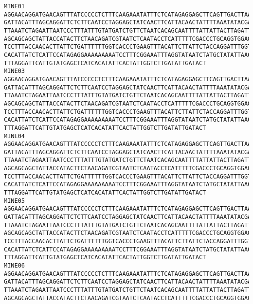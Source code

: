 \documentclass[11pt]{article}
\begin{document}
    \begin{Verbatim}[commandchars=\\\{\}]
MINE01
AGGAACAGGATGAACAGTTTATCCCCCTCTTTCAAGAAATATTTCTCATAGAGGAGCTTCAGTTGACTTAAGAATCTTCA
GATTACATTTAGCAGGATTCTCTTCAATCCTAGGAGCTATCAACTTCATTACAACTATTTTAAATATACGACCAAAAAAC
TTAAATCTAGAATTAATCCCTTTATTTGTATGATCTGTTCTAATCACAGCAATTTTATTATTACTTAGATTACCAGTCTT
AGCAGCAGCTATTACCATACTTCTAACAGATCGTAATCTCAATACCTCATTTTTCGACCCTGCAGGTGGAGGAGACCCAA
TCCTTTACCAACACTTATTCTGATTTTTTGGTCACCCTGAAGTTTACATTCTTATTCTACCAGGATTTGGTATTATTTCT
CACATTATCTCATTCCATAGAGGAAAAAAAAATCCTTTCGGAAATTTAGGTATAATCTATGCTATATTAACTATTGGAAT
TTTAGGATTCATTGTATGAGCTCATCACATATTCACTATTGGTCTTGATATTGATACT
MINE03
AGGAACAGGATGAACAGTTTATCCCCCTCTTTCAAGAAATATTTCTCATAGAGGAGCTTCAGTTGACTTAAGAATCTTCA
GATTACATTTAGCAGGATTCTCTTCAATCCTAGGAGCTATCAACTTCATTACAACTATTTTAAATATACGACCAAAAAAC
TTAAATCTAGAATTAATCCCTTTATTTGTATGATCTGTTCTAATCACAGCAATTTTATTATTACTTAGATTACCAGTCTT
AGCAGCAGCTATTACCATACTTCTAACAGATCGTAATCTCAATACCTCATTTTTCGACCCTGCAGGTGGAGGAGACCCAA
TCCTTTACCAACACTTATTCTGATTTTTTGGTCACCCTGAAGTTTACATTCTTATTCTACCAGGATTTGGTATTATTTCT
CACATTATCTCATTCCATAGAGGAAAAAAAAATCCTTTCGGAAATTTAGGTATAATCTATGCTATATTAACTATTGGAAT
TTTAGGATTCATTGTATGAGCTCATCACATATTCACTATTGGTCTTGATATTGATACT
MINE04
AGGAACAGGATGAACAGTTTATCCCCCTCTTTCAAGAAATATTTCTCATAGAGGAGCTTCAGTTGACTTAAGAATCTTCA
GATTACATTTAGCAGGATTCTCTTCAATCCTAGGAGCTATCAACTTCATTACAACTATTTTAAATATACGACCAAAAAAC
TTAAATCTAGAATTAATCCCTTTATTTGTATGATCTGTTCTAATCACAGCAATTTTATTATTACTTAGATTACCAGTCTT
AGCAGCAGCTATTACCATACTTCTAACAGATCGTAATCTCAATACCTCATTTTTCGACCCTGCAGGTGGAGGAGACCCAA
TCCTTTACCAACACTTATTCTGATTTTTTGGTCACCCTGAAGTTTACATTCTTATTCTACCAGGATTTGGTATTATTTCT
CACATTATCTCATTCCATAGAGGAAAAAAAAATCCTTTCGGAAATTTAGGTATAATCTATGCTATATTAACTATTGGAAT
TTTAGGATTCATTGTATGAGCTCATCACATATTCACTATTGGTCTTGATATTGATACT
MINE05
AGGAACAGGATGAACAGTTTATCCCCCTCTTTCAAGAAATATTTCTCATAGAGGAGCTTCAGTTGACTTAAGAATCTTCA
GATTACATTTAGCAGGATTCTCTTCAATCCTAGGAGCTATCAACTTCATTACAACTATTTTAAATATACGACCAAAAAAC
TTAAATCTAGAATTAATCCCTTTATTTGTATGATCTGTTCTAATCACAGCAATTTTATTATTACTTAGATTACCAGTCTT
AGCAGCAGCTATTACCATACTTCTAACAGATCGTAATCTCAATACCTCATTTTTCGACCCTGCAGGTGGAGGAGACCCAA
TCCTTTACCAACACTTATTCTGATTTTTTGGTCACCCTGAAGTTTACATTCTTATTCTACCAGGATTTGGTATTATTTCT
CACATTATCTCATTCCATAGAGGAAAAAAAAATCCTTTCGGAAATTTAGGTATAATCTATGCTATATTAACTATTGGAAT
TTTAGGATTCATTGTATGAGCTCATCACATATTCACTATTGGTCTTGATATTGATACT
MINE06
AGGAACAGGATGAACAGTTTATCCCCCTCTTTCAAGAAATATTTCTCATAGAGGAGCTTCAGTTGACTTAAGAATCTTCA
GATTACATTTAGCAGGATTCTCTTCAATCCTAGGAGCTATCAACTTCATTACAACTATTTTAAATATACGACCAAAAAAC
TTAAATCTAGAATTAATCCCTTTATTTGTATGATCTGTTCTAATCACAGCAATTTTATTATTACTTAGATTACCAGTCTT
AGCAGCAGCTATTACCATACTTCTAACAGATCGTAATCTCAATACCTCATTTTTCGACCCTGCAGGTGGAGGAGACCCAA

\end{Verbatim}
\end{document}
